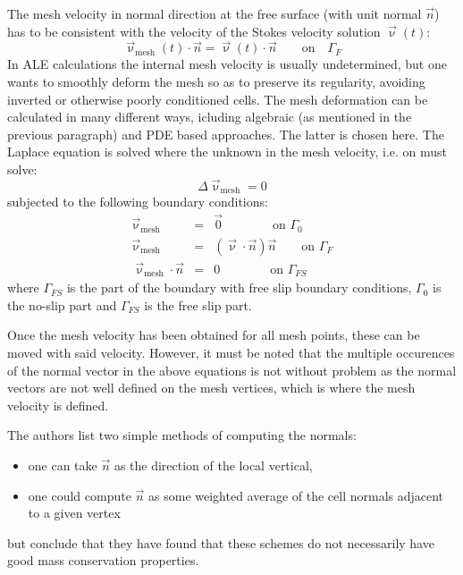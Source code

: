 The mesh velocity in normal direction at the free surface (with
unit normal $\vec{n}$) has to be consistent with the velocity of the Stokes
velocity solution $\vec{\upnu}(t)$:
\begin{equation}
\vec{\upnu}_{\text{mesh}}(t)\cdot \vec{n} = \vec{\upnu}(t)\cdot \vec{n} 
\qquad
\text{on}
\quad
\Gamma_F
\end{equation}
In ALE calculations the internal mesh velocity is usually undetermined, 
but one wants to smoothly deform the mesh so as to preserve its regularity, 
avoiding inverted or otherwise poorly conditioned cells. 
The mesh deformation can be calculated in many different ways, icluding algebraic 
(as mentioned in the previous paragraph) and PDE based approaches.
The latter is chosen here. 
The Laplace equation is solved where the unknown in the mesh velocity, i.e. 
on must solve:
\begin{equation}
\Delta \vec{\upnu}_{\text{mesh}} = 0\label{eq:fsaspect1}
\end{equation}
subjected to the following boundary conditions:
\begin{eqnarray}
\vec{\upnu}_{\text{mesh}} &=& \vec{0} \qquad\qquad \text{on } \Gamma_0 \\
\vec{\upnu}_{\text{mesh}} &=& (\vec{\upnu}\cdot\vec{n})\vec{n} \qquad \text{on } \Gamma_F \\
\vec{\upnu}_{\text{mesh}}\cdot \vec{n} &=& 0 \qquad\qquad \text{on } \Gamma_{FS} \label{eq:fsaspect2}
\end{eqnarray}
where $\Gamma_{FS}$ is the part of the boundary with free slip boundary conditions, 
$\Gamma_0$ is the no-slip part and $\Gamma_{FS}$ is the free slip part.

Once the mesh velocity has been obtained for all mesh points, these can be moved with 
said velocity. However, it must be noted that the multiple occurences of the normal vector
in the above equations is not without problem as the normal vectors are not well defined on the
mesh vertices, which is where the mesh velocity is defined.

The authors list two simple methods of computing the normals:
\begin{itemize}
\item one can take $\vec{n}$ as the direction of the local vertical,
\item one could compute $\vec{n}$ as some weighted average of the cell normals adjacent to a given
vertex
\end{itemize}
but conclude that they have found that these schemes do not necessarily
have good mass conservation properties.

